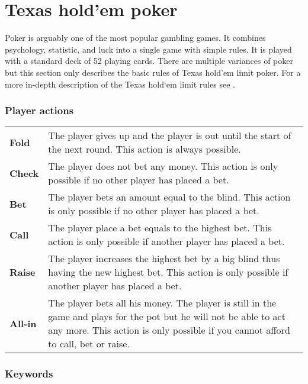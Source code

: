 \section*{Texas hold'em poker}
Poker is arguably one of the most popular gambling games. It combines psychology, statistic, and luck into a single game with simple rules.  It is played with a standard deck of 52 playing cards. There are multiple variances of poker but this section only describes the basic rules of Texas hold'em limit poker. For a more in-depth description of the Texas hold`em limit rules see \cite{poker-rules}.

\subsubsection*{Player actions}
\begin{tabular}{ p{0.1\linewidth} p{0.9\linewidth} }
  \textbf{Fold} & The player gives up and the player is out until the start of the next round. This action is always possible.\\
  \textbf{Check} & The player does not bet any money. This action is only possible if no other player has placed a bet.\\
  \textbf{Bet} & The player bets an amount equal to the blind. This action is only possible if no other player has placed a bet.\\
  \textbf{Call} & The player place a bet equals to the highest bet. This action is only possible if another player has placed a bet.\\
  \textbf{Raise} & The player increases the highest bet by a big blind thus having the new highest bet. This action is only possible if another player has placed a bet.\\
  \textbf{All-in} & The player bets all his money. The player is still in the game and plays for the pot but he will not be able to act any more. This action is only possible if you cannot afford to call, bet or raise.\\
\end{tabular}

\subsubsection*{Keywords}

